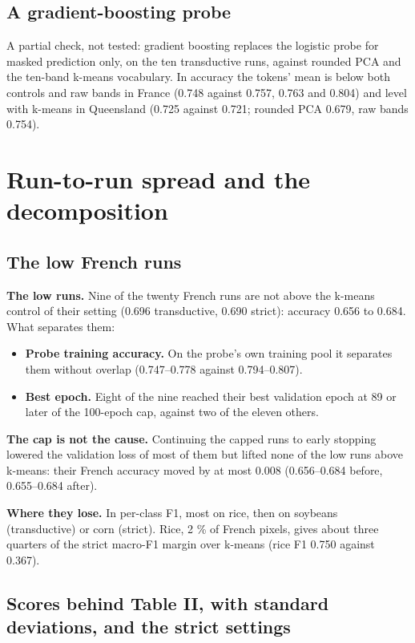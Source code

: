 \documentclass[10pt]{article}
\begin{document}
\subsection{A gradient-boosting probe}

A partial check, not tested: gradient boosting replaces the logistic probe for masked prediction only, on the ten transductive runs, against rounded PCA and the ten-band k-means vocabulary. In accuracy the tokens' mean is below both controls and raw bands in France (0.748 against 0.757, 0.763 and 0.804) and level with k-means in Queensland (0.725 against 0.721; rounded PCA 0.679, raw bands 0.754).

\section{Run-to-run spread and the decomposition}

\subsection{The low French runs}

\textbf{The low runs.} Nine of the twenty French runs are not above the k-means control of their setting (0.696 transductive, 0.690 strict): accuracy 0.656 to 0.684. What separates them:

\begin{itemize}
\item \textbf{Probe training accuracy.} On the probe's own training pool it separates them without overlap (0.747--0.778 against 0.794--0.807).
\item \textbf{Best epoch.} Eight of the nine reached their best validation epoch at 89 or later of the 100-epoch cap, against two of the eleven others.
\end{itemize}

\textbf{The cap is not the cause.} Continuing the capped runs to early stopping lowered the validation loss of most of them but lifted none of the low runs above k-means: their French accuracy moved by at most 0.008 (0.656--0.684 before, 0.655--0.684 after).

\textbf{Where they lose.} In per-class F1, most on rice, then on soybeans (transductive) or corn (strict). Rice, 2 \% of French pixels, gives about three quarters of the strict macro-F1 margin over k-means (rice F1 0.750 against 0.367).

\subsection{Scores behind Table II, with standard deviations, and the strict settings}
\end{document}

